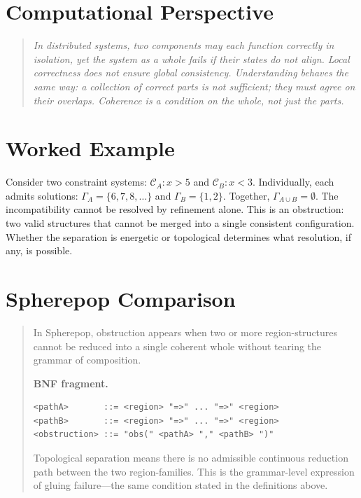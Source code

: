 \documentclass[11pt]{book}
\theoremstyle{plain}
\theoremstyle{definition}
\theoremstyle{remark}
\newenvironment{computationalaside}
  {\begin{quote}\small\itshape}
  {\end{quote}}
\newenvironment{spherepopcomparison}
  {\begin{quote}\small}
  {\end{quote}}
\begin{document}
\section*{Computational Perspective}
\begin{computationalaside}
In distributed systems, two components may each function correctly in
isolation, yet the system as a whole fails if their states do not align.
Local correctness does not ensure global consistency. Understanding
behaves the same way: a collection of correct parts is not sufficient;
they must agree on their overlaps. Coherence is a condition on the whole,
not just the parts.
\end{computationalaside}

\section*{Worked Example}
Consider two constraint systems: $\mathcal{C}_A: x > 5$ and
$\mathcal{C}_B: x < 3$. Individually, each admits solutions:
$\Gamma_A = \{6,7,8,\dots\}$ and $\Gamma_B = \{1,2\}$. Together,
$\Gamma_{A \cup B} = \emptyset$. The incompatibility cannot be resolved
by refinement alone. This is an obstruction: two valid structures that
cannot be merged into a single consistent configuration. Whether the
separation is energetic or topological determines what resolution, if
any, is possible.

\section*{Spherepop Comparison}
\begin{spherepopcomparison}
In Spherepop, obstruction appears when two or more region-structures
cannot be reduced into a single coherent whole without tearing the
grammar of composition.

\textbf{BNF fragment.}
\begin{verbatim}
<pathA>       ::= <region> "=>" ... "=>" <region>
<pathB>       ::= <region> "=>" ... "=>" <region>
<obstruction> ::= "obs(" <pathA> "," <pathB> ")"
\end{verbatim}

Topological separation means there is no admissible continuous reduction
path between the two region-families. This is the grammar-level
expression of gluing failure---the same condition stated in the
definitions above.
\end{spherepopcomparison}
\end{document}
